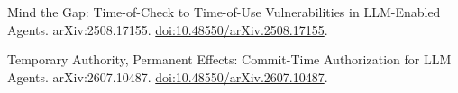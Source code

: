 \documentclass[11pt]{article}
\theoremstyle{definition}
\begin{document}
\begin{OpusReferences}
\newblock Mind the Gap: Time-of-Check to Time-of-Use Vulnerabilities in LLM-Enabled Agents.
\newblock arXiv:2508.17155.
\newblock \href{https://doi.org/10.48550/arXiv.2508.17155}{doi:10.48550/arXiv.2508.17155}.

\newblock Temporary Authority, Permanent Effects: Commit-Time Authorization for LLM Agents.
\newblock arXiv:2607.10487.
\newblock \href{https://doi.org/10.48550/arXiv.2607.10487}{doi:10.48550/arXiv.2607.10487}.

\end{OpusReferences}
\end{document}
